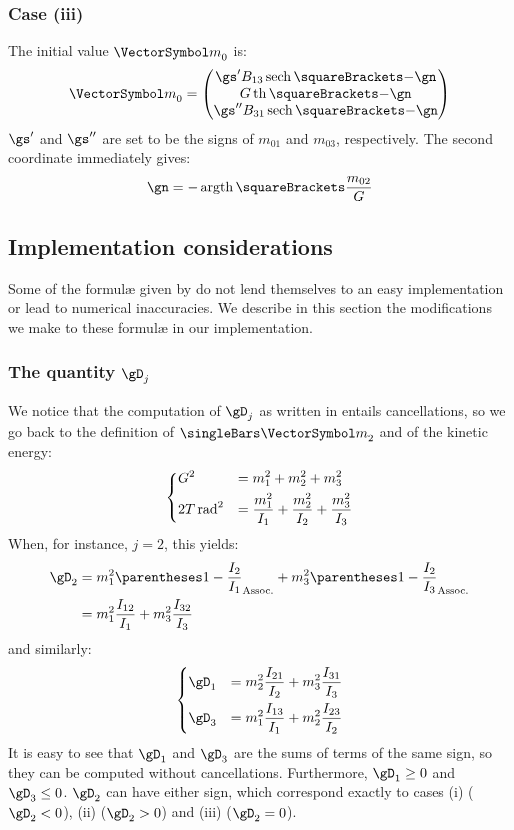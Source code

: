 \documentclass[10pt, a4paper, twoside]{basestyle}
\begin{document}
\subsubsection*{Case (iii)}
The initial value ${\vm}_0$  is:
\[
{\vm}_0 =
\begin{pmatrix}
\gs' B_{13} \HyperbolicSecant\of{-\gn} \\
G \HyperbolicTangent\of{-\gn} \\
\gs'' B_{31} \HyperbolicSecant\of{-\gn}
\end{pmatrix}
\]
$\gs'$ and $\gs''$ are set to be the signs of $m_{01}$ and $m_{03}$, respectively.  The second coordinate immediately gives:
\[
\gn = -\InverseHyperbolicTangent\of{\frac{m_{02}}{G}}
\]

\subsection*{Implementation considerations}
Some of the formulæ given by \cite{Celledoni2007} do not lend themselves to an easy implementation or lead to numerical inaccuracies.  We
describe in this section the modifications we make to these formulæ in our implementation.

\subsubsection*{The quantity $\gD_j$}
We notice that the computation of $\gD_j$ as written in \cite{Celledoni2007} entails cancellations, so we go back to the definition of $\norm{\vm}$ and of the kinetic energy:
\[
\begin{dcases}
G^2 &= m_1^2 + m_2^2 + m_3^2 \\
2 T \operatorname{rad}^2 &= \frac{m_1^2}{I_1} + \frac{m_2^2}{I_2} + \frac{m_3^2}{I_3}
\end{dcases}
\]
When, for instance, $j = 2$, this yields:
\begin{align*}
\gD_2 &= m_1^2 \pa{1 - \frac{I_2}{I_1}} + m_3^2 \pa{1 - \frac{I_2}{I_3}} \\
&= m_1^2 \frac{I_{12}}{I_1} + m_3^2 \frac{I_{32}}{I_3}
\end{align*}
and similarly:
\[
\begin{dcases}
\gD_1 &= m_2^2 \frac{I_{21}}{I_2} + m_3^2 \frac{I_{31}}{I_3} \\
\gD_3 &= m_1^2 \frac{I_{13}}{I_1} + m_2^2 \frac{I_{23}}{I_2}
\end{dcases}
\]
It is easy to see that $\gD_1$ and $\gD_3$ are the sums of terms of the same sign, so they can be computed without cancellations.  Furthermore,
$\gD_1 \geq 0$ and $\gD_3 \leq 0$.  $\gD_2$ can have either sign, which correspond exactly to cases (i) ($\gD_2 < 0$), (ii) ($\gD_2 > 0$) and 
(iii) ($\gD_2 = 0$).
\end{document}
